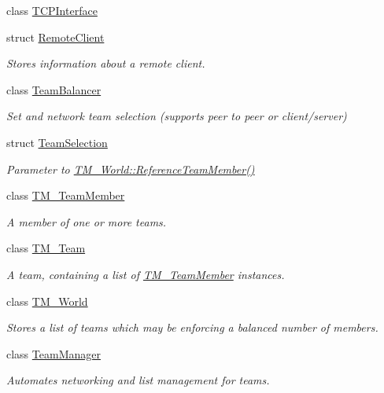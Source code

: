 \begin{DoxyCompactItemize}
class \hyperlink{class_rak_net_1_1_t_c_p_interface}{T\-C\-P\-Interface}
\item 
struct \hyperlink{struct_rak_net_1_1_remote_client}{Remote\-Client}
\begin{DoxyCompactList}\small\item\em Stores information about a remote client. \end{DoxyCompactList}\item 
class \hyperlink{class_rak_net_1_1_team_balancer}{Team\-Balancer}
\begin{DoxyCompactList}\small\item\em Set and network team selection (supports peer to peer or client/server) \end{DoxyCompactList}\item 
struct \hyperlink{struct_rak_net_1_1_team_selection}{Team\-Selection}
\begin{DoxyCompactList}\small\item\em Parameter to \hyperlink{class_rak_net_1_1_t_m___world_a13c60cbb4d1894aece9e1b1b9887601f}{T\-M\-\_\-\-World\-::\-Reference\-Team\-Member()} \end{DoxyCompactList}\item 
class \hyperlink{class_rak_net_1_1_t_m___team_member}{T\-M\-\_\-\-Team\-Member}
\begin{DoxyCompactList}\small\item\em A member of one or more teams. \end{DoxyCompactList}\item 
class \hyperlink{class_rak_net_1_1_t_m___team}{T\-M\-\_\-\-Team}
\begin{DoxyCompactList}\small\item\em A team, containing a list of \hyperlink{class_rak_net_1_1_t_m___team_member}{T\-M\-\_\-\-Team\-Member} instances. \end{DoxyCompactList}\item 
class \hyperlink{class_rak_net_1_1_t_m___world}{T\-M\-\_\-\-World}
\begin{DoxyCompactList}\small\item\em Stores a list of teams which may be enforcing a balanced number of members. \end{DoxyCompactList}\item 
class \hyperlink{class_rak_net_1_1_team_manager}{Team\-Manager}
\begin{DoxyCompactList}\small\item\em Automates networking and list management for teams. \end{DoxyCompactList}\item 

\end{DoxyCompactItemize}
